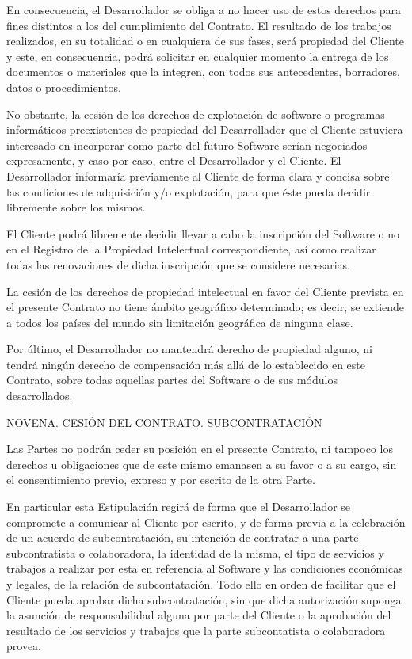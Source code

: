 \documentclass[a4paper,11pt]{report}
\begin{document}
En consecuencia, el Desarrollador se obliga a no hacer uso de estos
derechos para fines distintos a los del cumplimiento del Contrato. El
resultado de los trabajos realizados, en su totalidad o en cualquiera de
sus fases, será propiedad del Cliente y este, en consecuencia, podrá
solicitar en cualquier momento la entrega de los documentos o materiales
que la integren, con todos sus antecedentes, borradores, datos o
procedimientos.

No obstante, la cesión de los derechos de explotación de software o
programas informáticos preexistentes de propiedad del Desarrollador que
el Cliente estuviera interesado en incorporar como parte del futuro
Software serían negociados expresamente, y caso por caso, entre el
Desarrollador y el Cliente. El Desarrollador informaría previamente al
Cliente de forma clara y concisa sobre las condiciones de adquisición
y/o explotación, para que éste pueda decidir libremente sobre los
mismos.

El Cliente podrá libremente decidir llevar a cabo la inscripción del
Software o no en el Registro de la Propiedad Intelectual
correspondiente, así como realizar todas las renovaciones de dicha
inscripción que se considere necesarias.

La cesión de los derechos de propiedad intelectual en favor del Cliente
prevista en el presente Contrato no tiene ámbito geográfico determinado;
es decir, se extiende a todos los países del mundo sin limitación
geográfica de ninguna clase.

Por último, el Desarrollador no mantendrá derecho de propiedad alguno,
ni tendrá ningún derecho de compensación más allá de lo establecido en
este Contrato, sobre todas aquellas partes del Software o de sus módulos
desarrollados.

NOVENA. CESIÓN DEL CONTRATO. SUBCONTRATACIÓN

Las Partes no podrán ceder su posición en el presente Contrato, ni
tampoco los derechos u obligaciones que de este mismo emanasen a su
favor o a su cargo, sin el consentimiento previo, expreso y por escrito
de la otra Parte.

En particular esta Estipulación regirá de forma que el Desarrollador se
compromete a comunicar al Cliente por escrito, y de forma previa a la
celebración de un acuerdo de subcontratación, su intención de contratar
a una parte subcontratista o colaboradora, la identidad de la misma, el
tipo de servicios y trabajos a realizar por esta en referencia al
Software y las condiciones económicas y legales, de la relación de
subcontatación. Todo ello en orden de facilitar que el Cliente pueda
aprobar dicha subcontratación, sin que dicha autorización suponga la
asunción de responsabilidad alguna por parte del Cliente o la aprobación
del resultado de los servicios y trabajos que la parte subcontatista o
colaboradora provea.
\end{document}
